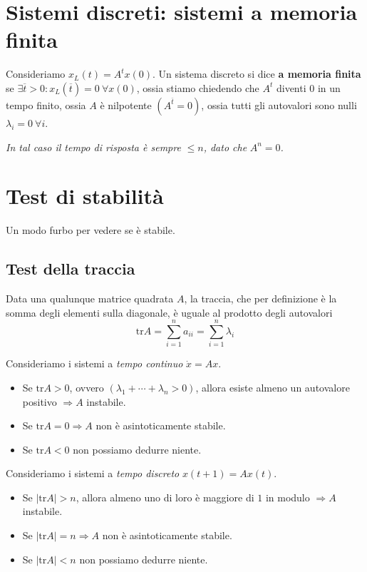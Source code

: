 \documentclass[10pt,a4paper]{book}
\begin{document}
\section{Sistemi discreti: sistemi a memoria finita}

Consideriamo $x_{L}\left( t\right) =A^{t} x\left( 0\right)$. Un sistema discreto si dice \textbf{a memoria finita} se $\exists \overline{t}  >0:x_{L}\left(\overline{t}\right) =0\ \forall x\left( 0\right)$, ossia stiamo chiedendo che $A^{t}$ diventi $0$ in un tempo finito, ossia $A$ è nilpotente $\left( A^{\overline{t}} =0\right)$, ossia tutti gli autovalori sono nulli $\lambda _{i} =0\ \forall i$.

\textit{In tal caso il tempo di risposta è sempre }$\leqslant n$\textit{, dato che }$A^{n} =0$\textit{.}
\section{Test di stabilità}

Un modo furbo per vedere se è stabile.
\subsection{Test della traccia}
\begin{ricalg}
Data una qualunque matrice quadrata $A$, la traccia, che per definizione è la somma degli elementi sulla diagonale, è uguale al prodotto degli autovalori
\begin{equation*}
\mathrm{tr} A=\sum\limits ^{n}_{i=1} a_{ii} =\sum\limits ^{n}_{i=1} \lambda _{i}
\end{equation*}
\end{ricalg}

Consideriamo i sistemi a \textit{tempo continuo} $\dot{x} =Ax$.
\begin{itemize}
\item Se $\mathrm{tr} A >0$, ovvero $\left( \lambda _{1} +\cdots +\lambda _{n}  >0\right)$, allora esiste almeno un autovalore positivo $\Rightarrow A$ instabile.
\item Se $\mathrm{tr} A=0\Rightarrow A$ non è asintoticamente stabile.
\item Se $\mathrm{tr} A< 0$ non possiamo dedurre niente.
\end{itemize}

Consideriamo i sistemi a \textit{tempo discreto} $x\left( t+1\right) =Ax\left( t\right)$.
\begin{itemize}
\item Se $\left| \mathrm{tr} A\right|  >n$, allora almeno uno di loro è maggiore di $1$ in modulo $\Rightarrow A$ instabile.
\item Se $\left| \mathrm{tr} A\right| =n\Rightarrow A$ non è asintoticamente stabile.
\item Se $\left| \mathrm{tr} A\right| < n$ non possiamo dedurre niente.
\end{itemize}
\end{document}
